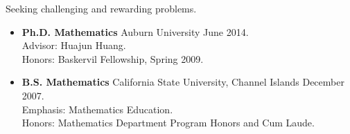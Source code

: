 \documentclass[11pt]{article}
\begin{document}

\makeletterhead


  Seeking challenging and rewarding problems.

  \begin{itemize}
    \item{}
      {\bf Ph.D. Mathematics}
        \syltab Auburn University
        \syltab June 2014.\\
      Advisor: Huajun Huang.\\
      Honors: Baskervil Fellowship, Spring 2009.
    \item{}
      {\bf B.S. Mathematics}
        \syltab California State University, Channel Islands
        \syltab December 2007.\\
      Emphasis: Mathematics Education.\\
      Honors: Mathematics Department Program Honors and Cum Laude.
  \end{itemize}
\end{document}
